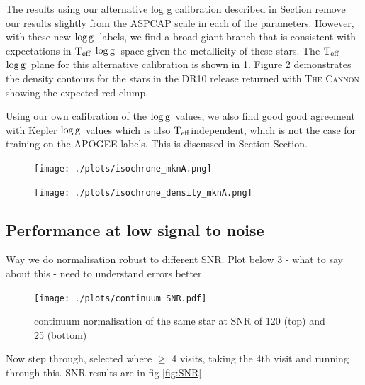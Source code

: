 \documentclass[12pt, preprint]{aastex}
\newcommand{\sectionname}{Section}
\newcommand{\teff}{\mbox{$\rm T_{eff}$}}
\newcommand{\logg}{\mbox{$\rm \log g$}}
\newcommand{\tc}{\textsc{The Cannon}}
\begin{document}
The results using our alternative log g calibration described in \sectionname{} remove our results slightly from the ASPCAP scale in each of the parameters. However, with these new \logg\ labels, we find a broad giant branch that is consistent with expectations in \teff-\logg\ space given the metallicity of these stars. The \teff-\logg\ plane for this alternative calibration is shown in \ref{fig:mknA}. Figure \ref{fig:iso_density} demonstrates the density contours for the stars in the DR10 release returned with \tc\, showing the expected red clump. 


Using our own calibration of the \logg\ values, we also find good  good agreement with Kepler \logg\ values which is also \teff independent, which is not the case for training on the APOGEE labels. This is discussed in Section \sectionname{}.  


\begin{figure}[h!]
  \texttt{[image: ./plots/isochrone\_mknA.png]}
\caption{\small{}}
\label{fig:mknA}
\end{figure}

\begin{figure}[h!]
  \texttt{[image: ./plots/isochrone\_density\_mknA.png]}
\caption{\small{}}
\label{fig:iso_density}
\end{figure}



 \subsection{Performance at low signal to noise}

 
 Way we do normalisation robust to different SNR. Plot below \ref{fig:lowsnr}
 - what to say about this 
 - need to understand errors better. 
 
 
\begin{figure}[h!]
  \texttt{[image: ./plots/continuum\_SNR.pdf]}
\caption{continuum normalisation of the same star at SNR of 120 (top) and 25 (bottom) }
\label{fig:lowsnr}
\end{figure}

Now step through, selected where $\ge$ 4 visits, taking the 4th visit and running through this. SNR results are in fig \ref{fig:SNR}
\end{document}
